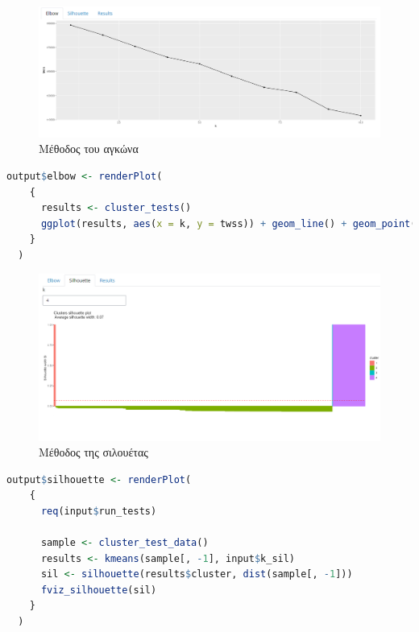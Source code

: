 \documentclass[greek, 12pt]{article}
\begin{document}
\newpage

\begin{figure}[h]
    \centering
    \includegraphics[width=\textwidth]{pictures/15_elbow_method.png}
    \caption{Μέθοδος του αγκώνα}
    \label{fig:15}
\end{figure}

\begin{lstlisting}[language=R, caption=Κώδικας για τη μέθοδο του αγκώνα, label={snippet:7}]
output$elbow <- renderPlot(
    {
      results <- cluster_tests()
      ggplot(results, aes(x = k, y = twss)) + geom_line() + geom_point()
    }
  )
\end{lstlisting}

\begin{figure}[h]
    \centering
    \includegraphics[width=\textwidth]{pictures/16_silhouette_method.png}
    \caption{Μέθοδος της σιλουέτας}
    \label{fig:16}
\end{figure}

\newpage

\begin{lstlisting}[language=R, caption=Κώδικας για τη μέθοδο της σιλουέτας, label={snippet:8}]
output$silhouette <- renderPlot(
    {
      req(input$run_tests)

      sample <- cluster_test_data()
      results <- kmeans(sample[, -1], input$k_sil)
      sil <- silhouette(results$cluster, dist(sample[, -1]))
      fviz_silhouette(sil)
    }
  )
\end{lstlisting}
\end{document}
